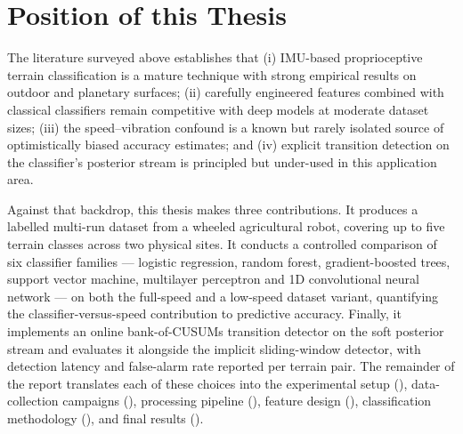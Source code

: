 \section{Position of this Thesis}
\label{sec:bg-summary}

The literature surveyed above establishes that (i) IMU-based proprioceptive terrain classification is a mature technique with strong empirical results on outdoor and planetary surfaces; (ii) carefully engineered features combined with classical classifiers remain competitive with deep models at moderate dataset sizes; (iii) the speed--vibration confound is a known but rarely isolated source of optimistically biased accuracy estimates; and (iv) explicit transition detection on the classifier's posterior stream is principled but under-used in this application area.

Against that backdrop, this thesis makes three contributions. It produces a labelled multi-run dataset from a wheeled agricultural robot, covering up to five terrain classes across two physical sites. It conducts a controlled comparison of six classifier families --- logistic regression, random forest, gradient-boosted trees, support vector machine, multilayer perceptron and 1D convolutional neural network --- on both the full-speed and a low-speed dataset variant, quantifying the classifier-versus-speed contribution to predictive accuracy. Finally, it implements an online bank-of-CUSUMs transition detector on the soft posterior stream and evaluates it alongside the implicit sliding-window detector, with detection latency and false-alarm rate reported per terrain pair. The remainder of the report translates each of these choices into the experimental setup (), data-collection campaigns (), processing pipeline (), feature design (), classification methodology (), and final results ().